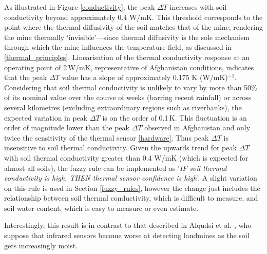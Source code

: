         As illustrated in Figure \ref{conductivity}, the peak \(\Delta T\) increases with soil conductivity beyond approximately 0.4 W/mK. This threshold corresponds to the point where the thermal diffusivity of the soil matches that of the mine, rendering the mine thermally ‘invisible’—since thermal diffusivity is the sole mechanism through which the mine influences the temperature field, as discussed in \ref{thermal_principles}. Linearisation of the thermal conductivity response at an operating point of 2\,W/mK, representative of Afghanistan conditions, indicates that the peak \(\Delta T\) value has a slope of approximately 0.175 K (W/mK)$^{-1}$. Considering that soil thermal conductivity is unlikely to vary by more than 50\% of its nominal value over the course of weeks (barring recent rainfall) or across several kilometres (excluding extraordinary regions such as riverbanks), the expected variation in peak \(\Delta T\) is on the order of 0.1\,K. This fluctuation is an order of magnitude lower than the peak \(\Delta T\) observed in Afghanistan and only twice the sensitivity of the thermal sensor \ref{hardware}. Thus peak \(\Delta T\) is insensitive to soil thermal conductivity. Given the upwards trend for peak \(\Delta T\) with soil thermal conductivity greater than 0.4 W/mK (which is expected for almost all soils), the fuzzy rule can be implemented as '\textit{IF soil thermal conductivity is high, THEN thermal sensor confidence is high}'. A slight variation on this rule is used in Section \ref{fuzzy_rules}, however the change just includes the relationship between soil thermal conductivity, which is difficult to measure, and soil water content, which is easy to measure or even estimate. 
        
        Interestingly, this result is in contrast to that described in Alqudsi et al. \cite{alqudsi2021review}, who suppose that infrared sensors become worse at detecting landmines as the soil gets increasingly moist.
        